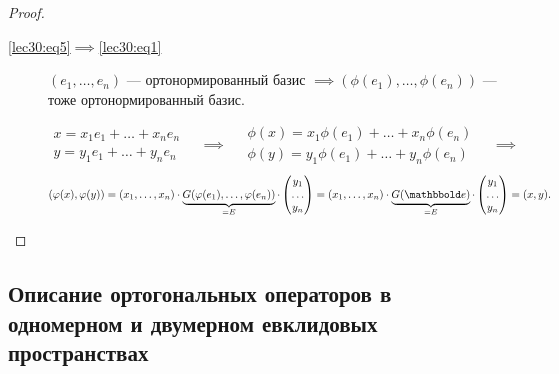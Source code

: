 \begin{proof}
\begin{description}
        \item[\ref{lec30:eq5}$\implies$\ref{lec30:eq1}] $(e_1, \dots, e_n)$ --- ортонормированный базис $\implies (\phi(e_1), \dots, \phi(e_n))$ --- тоже ортонормированный базис.

            \begin{equation*}
                \begin{gathered}
                    x = x_1 e_1 + \dots + x_n e_n \\
                    y = y_1 e_1 + \dots + y_n e_n
                \end{gathered} \quad \implies \quad
                \begin{gathered}
                    \phi(x) = x_1 \phi(e_1) + \dots + x_n \phi(e_n) \\
                    \phi(y) = y_1 \phi(e_1) + \dots + y_n \phi(e_n)
                \end{gathered} \quad \implies
            \end{equation*}
            \begin{equation*}
                (\phi(x), \phi(y)) = (x_1, \dots, x_n) \cdot \underbrace{G (\phi(e_1), \dots, \phi(e_n))}_{ = E} \cdot \begin{pmatrix} y_1 \\ \dots \\ y_n \end{pmatrix} = (x_1, \dots, x_n) \cdot \underbrace{G(\E)}_{ = E} \cdot \begin{pmatrix} y_1 \\ \dots \\ y_n \end{pmatrix} = (x, y)
            .\qedhere\end{equation*}
    \end{description}
\end{proof}

\begin{figure}[h]
    \centering
    \def\svgwidth{5cm}
    
\end{figure}


\subsection{Описание ортогональных операторов в одномерном и двумерном евклидовых пространствах}

